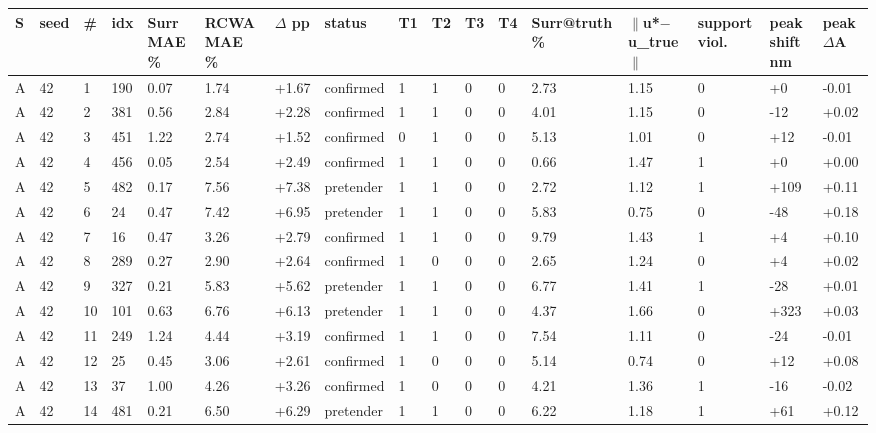 \documentclass[11pt,a4paper]{article}
\newcounter{none}   %
\begin{document}
\begingroup
\setlength{\tabcolsep}{2pt}\tiny
{}
\label{tab:10}
{\def\LTcaptype{none} %
\begin{longtable}[]{@{}lllllllllllllllll@{}}
\toprule\noalign{}
S & seed & \# & idx & Surr MAE \% & RCWA MAE \% & \ensuremath{\Delta} pp & status & T1 & T2 & T3 & T4 & Surr@truth \% & \ensuremath{\|}u*\ensuremath{-}u\_true\ensuremath{\|} & support viol. & peak shift nm & peak \ensuremath{\Delta}A \\
\midrule\noalign{}
\endhead
\bottomrule\noalign{}
\endlastfoot
A & 42 & 1 & 190 & 0.07 & 1.74 & +1.67 & confirmed & 1 & 1 & 0 & 0 & 2.73 & 1.15 & 0 & +0 & -0.01 \\
A & 42 & 2 & 381 & 0.56 & 2.84 & +2.28 & confirmed & 1 & 1 & 0 & 0 & 4.01 & 1.15 & 0 & -12 & +0.02 \\
A & 42 & 3 & 451 & 1.22 & 2.74 & +1.52 & confirmed & 0 & 1 & 0 & 0 & 5.13 & 1.01 & 0 & +12 & -0.01 \\
A & 42 & 4 & 456 & 0.05 & 2.54 & +2.49 & confirmed & 1 & 1 & 0 & 0 & 0.66 & 1.47 & 1 & +0 & +0.00 \\
A & 42 & 5 & 482 & 0.17 & 7.56 & +7.38 & pretender & 1 & 1 & 0 & 0 & 2.72 & 1.12 & 1 & +109 & +0.11 \\
A & 42 & 6 & 24 & 0.47 & 7.42 & +6.95 & pretender & 1 & 1 & 0 & 0 & 5.83 & 0.75 & 0 & -48 & +0.18 \\
A & 42 & 7 & 16 & 0.47 & 3.26 & +2.79 & confirmed & 1 & 1 & 0 & 0 & 9.79 & 1.43 & 1 & +4 & +0.10 \\
A & 42 & 8 & 289 & 0.27 & 2.90 & +2.64 & confirmed & 1 & 0 & 0 & 0 & 2.65 & 1.24 & 0 & +4 & +0.02 \\
A & 42 & 9 & 327 & 0.21 & 5.83 & +5.62 & pretender & 1 & 1 & 0 & 0 & 6.77 & 1.41 & 1 & -28 & +0.01 \\
A & 42 & 10 & 101 & 0.63 & 6.76 & +6.13 & pretender & 1 & 1 & 0 & 0 & 4.37 & 1.66 & 0 & +323 & +0.03 \\
A & 42 & 11 & 249 & 1.24 & 4.44 & +3.19 & confirmed & 1 & 1 & 0 & 0 & 7.54 & 1.11 & 0 & -24 & -0.01 \\
A & 42 & 12 & 25 & 0.45 & 3.06 & +2.61 & confirmed & 1 & 0 & 0 & 0 & 5.14 & 0.74 & 0 & +12 & +0.08 \\
A & 42 & 13 & 37 & 1.00 & 4.26 & +3.26 & confirmed & 1 & 0 & 0 & 0 & 4.21 & 1.36 & 1 & -16 & -0.02 \\
A & 42 & 14 & 481 & 0.21 & 6.50 & +6.29 & pretender & 1 & 1 & 0 & 0 & 6.22 & 1.18 & 1 & +61 & +0.12 \\

\end{longtable}}
\end{document}
